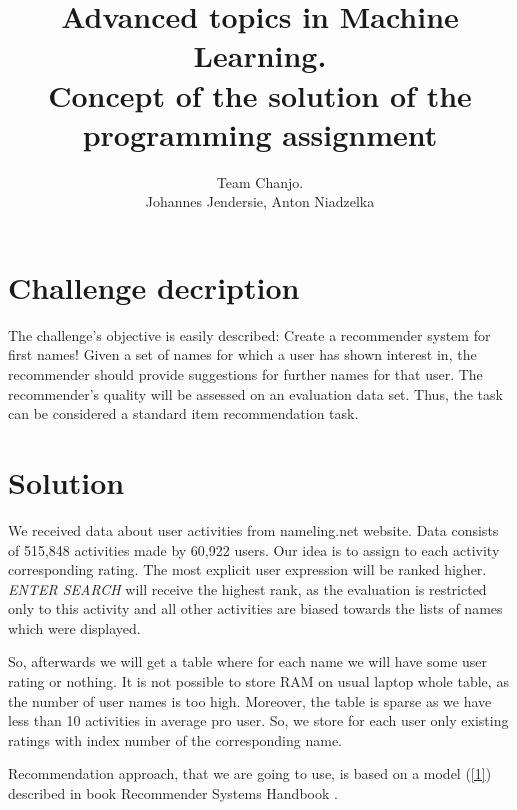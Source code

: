 \documentclass[a4paper,11pt]{article}
\title{Advanced topics in Machine Learning. \\ Concept of the solution of the programming assignment}
\author{ Team Chanjo. \\ Johannes Jendersie, Anton Niadzelka }
\begin{document}
\maketitle

\section{Challenge decription}
The challenge’s objective is easily described: Create a recommender system for first names! Given a set of names for which a user has shown interest in, the recommender should provide suggestions for further names for that user. The recommender’s quality will be assessed on an evaluation data set. Thus, the task can be considered a standard item recommendation task.

\section{Solution}

We received data about user activities from nameling.net website. Data consists of 515,848 activities made by 60,922 users. Our idea is to assign to each activity corresponding rating. The most explicit user expression will be ranked higher. \textit{ENTER SEARCH} will receive the highest rank, as  the evaluation is restricted only to this activity and all other activities are biased towards the lists of names which were displayed. 


So, afterwards we will get a table where for each name we will have some user rating or nothing. It is not possible to store RAM on usual laptop whole table, as the number of user names is too high. Moreover, the table is sparse as we have less than 10 activities in average pro user. So, we store for each user only existing ratings with index number of the corresponding name.

Recommendation approach, that we are going to use, is based on a model (\ref{1}) described in book Recommender Systems Handbook \cite{1}. 
\end{document}
